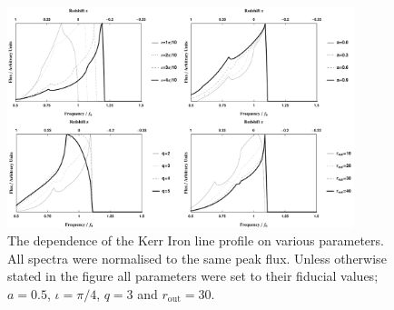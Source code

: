 \begin{figure}[t]
 \centering
 \includegraphics[trim=0cm 0cm 0cm 0cm, width=0.9\textwidth]{KerrLines.pdf}
 \caption{The dependence of the Kerr Iron line profile on various parameters. All spectra were normalised to the same peak flux. Unless otherwise stated in the figure all parameters were set to their fiducial values; $a=0.5$, $\iota=\pi/4$, $q=3$ and $r_{\textrm{out}}=30$.}
 \label{fig:KerrLine}
\end{figure}

